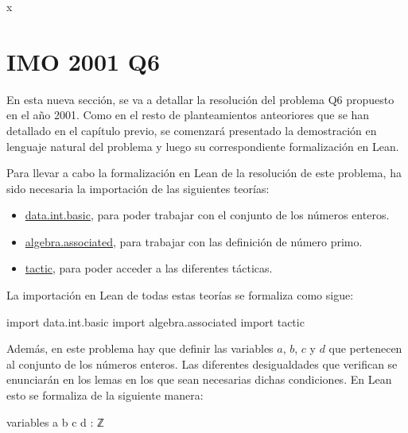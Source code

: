 x\section{IMO 2001 Q6}

En esta nueva sección, se va a detallar la resolución del problema Q6
propuesto en el año 2001. Como en el resto de planteamientos anteoriores
que se han detallado en el capítulo previo, se comenzará presentado la
demostración en lenguaje natural del problema y luego su correspondiente
formalización en Lean.

\noindent
{}

Para llevar a cabo la formalización en Lean de la resolución de este
problema, ha sido necesaria la importación de las siguientes teorías:
\begin{itemize}
\item
  \href{https://github.com/leanprover-community/mathlib/blob/master/src/data/int/basic.lean}{data.int.basic},
  para poder trabajar con el conjunto de los números enteros.
\item
  \href{https://github.com/leanprover-community/mathlib/blob/master/src/algebra/associated.lean}{algebra.associated},
  para trabajar con las definición de número primo.
\item
  \href{https://github.com/leanprover-community/mathlib/tree/master/src/tactic}{tactic},
  para poder acceder a las diferentes tácticas.
\end{itemize}

La importación en Lean de todas estas teorías se formaliza como sigue:
\begin{leancode}
import data.int.basic
import algebra.associated
import tactic
\end{leancode}

Además, en este problema hay que definir las variables \(a\), \(b\),
\(c\) y \(d\) que pertenecen al conjunto de los números enteros. Las
diferentes desigualdades que verifican se enunciarán en los lemas en los
que sean necesarias dichas condiciones. En Lean esto se formaliza de la
siguiente manera:
\begin{leancode}
variables {a b c d : ℤ}
\end{leancode}

